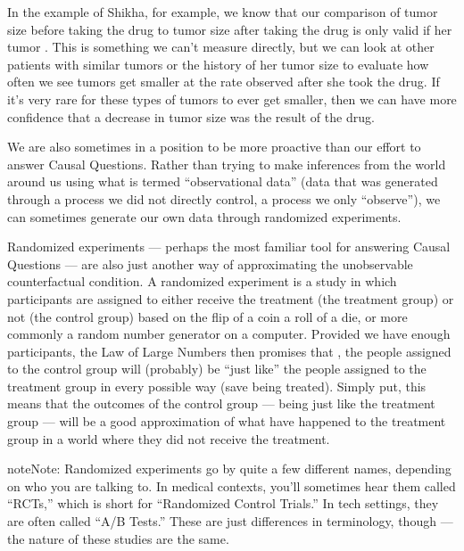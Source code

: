 \documentclass[letterpaper,10pt,english]{jupyterBook}
\begin{document}
\sphinxAtStartPar
In the example of Shikha, for example, we know that our comparison of tumor size before taking the drug to tumor size after taking the drug is only valid if her tumor . This is something we can’t measure directly, but we can look at other patients with similar tumors or the history of her tumor size to evaluate how often we see tumors get smaller at the rate observed after she took the drug. If it’s very rare for these types of tumors to ever get smaller, then we can have more confidence that a decrease in tumor size was the result of the drug.

\sphinxAtStartPar
We are also sometimes in a position to be more proactive than our effort to answer Causal Questions. Rather than trying to make inferences from the world around us using what is termed “observational data” (data that was generated through a process we did not directly control, a process we only “observe”), we can sometimes generate our own data through randomized experiments.

\sphinxAtStartPar
Randomized experiments — perhaps the most familiar tool for answering Causal Questions — are also just another way of approximating the unobservable counterfactual condition. A randomized experiment is a study in which participants are assigned to either receive the treatment (the treatment group) or not (the control group) based on the flip of a coin a roll of a die, or \sphinxhyphen{} more commonly \sphinxhyphen{} a random number generator on a computer. Provided we have enough participants, the Law of Large Numbers then promises that , the people assigned to the control group will (probably) be “just like” the people assigned to the treatment group in every possible way (save being treated). Simply put, this means that the outcomes of the control group — being just like the treatment group  — will be a good approximation of what  have happened to the treatment group in a world where they did not receive the treatment.

\begin{sphinxadmonition}{note}{Note:}
\sphinxAtStartPar
Randomized experiments go by quite a few different names, depending on who you are talking to. In medical contexts, you’ll sometimes hear them called “RCTs,” which is short for “Randomized Control Trials.” In tech settings, they are often called “A/B Tests.” These are just differences in terminology, though — the nature of these studies are the same.
\end{sphinxadmonition}
\end{document}
